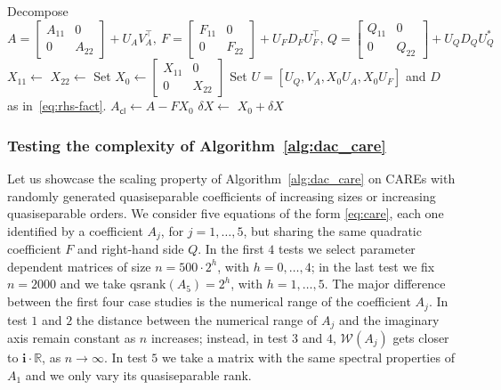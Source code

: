 \documentclass[a4paper,10pt]{article}
\def\qsrank{\mathrm{qsrank}}
\begin{document}
\begin{algorithm}
	\caption{Divide-and-conquer method for CAREs with HSS coefficients}\label{alg:dac_care}
	\begin{algorithmic}[1]
		\State \Return {}
		\Else
		\State Decompose \[A =\begin{bmatrix}
			A_{11}&0 \\ 0&A_{22}
		\end{bmatrix}+U_AV_A^\top,\ F=\begin{bmatrix}
		F_{11}&0 \\ 0&F_{22}
	\end{bmatrix} + U_FD_FU_F^\top,\, Q=\begin{bmatrix}
			Q_{11}& 0\\ 0&Q_{22}
		\end{bmatrix}+U_QD_QU_Q^*\]
		\State $X_{11} \gets $ 
		\State $X_{22} \gets $ 
		\State \label{line:X0} Set $X_0\gets\begin{bmatrix}
			X_{11} & 0 \\ 0&X_{22}
		\end{bmatrix}$
		\State \label{line:largerlowrank} Set $U=[U_Q, V_A, X_0U_A,X_0U_F]$ and 
		$D$ as in~\eqref{eq:rhs-fact}. \label{step:lr-rhs}
		\State $A_{\mathsf{cl}}\gets A-FX_0$\label{step:sum1} 
		\State \label{line:lrupdate} $\delta X\gets $ 
		\State \label{step:hodlrcompress} \Return $X_0+\delta X$  \label{step:sum2} 
		\EndIf
		\EndProcedure
	\end{algorithmic}
\end{algorithm}

\subsubsection{Testing the complexity of Algorithm~\ref{alg:dac_care}}\label{sec:caresolve}
Let us showcase the scaling property of Algorithm~\ref{alg:dac_care} on CAREs with randomly generated quasiseparable coefficients of increasing sizes or increasing quasiseparable orders. We consider five equations of the form \eqref{eq:care}, each one identified by a coefficient $A_j$, for $j=1,\dots,5$, but sharing the same  quadratic coefficient $F$ and right-hand side $Q$. In the first $4$ tests we select parameter dependent matrices of size $n=500\cdot 2^h$, with $h=0,\dots, 4$; in the last test we fix $n=2000$ and we take $\qsrank(A_5)=2^h$, with $h=1,\dots, 5$.	The major difference between the first four case studies is the numerical range of the coefficient $A_j$. In test $1$ and $2$ the distance between the numerical range of $A_j$ and the imaginary axis remain constant as $n$ increases; instead, in test $3$ and $4$, $\mathcal W(A_j)$ gets closer to $\mathbf i\cdot \mathbb R$, as $n\to\infty$. In test $5$ we take a matrix with the same spectral properties of $A_1$ and we only vary its quasiseparable rank. 
\end{document}

